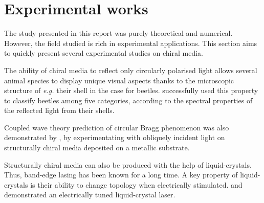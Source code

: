 \section{Experimental works}
\label{sec:experimental_work}

The study presented in this report was purely theoretical and numerical. However, the field studied is rich in experimental applications. This section aims to quickly present several experimental studies on chiral media.

The ability of chiral media to reflect only circularly polarised light allows several animal species to display unique visual aspects thanks to the microscopic structure of \textit{e.g.} their shell in the case for beetles. \Textcite{erten_experimental_2015} successfully used this property to classify beetles among five categories, according to the spectral properties of the reflected light from their shells.

Coupled wave theory prediction of circular Bragg phenomenon was also demonstrated by \textcite{carter_variation_2016}, by experimentating with obliquely incident light on structurally chiral media deposited on a metallic substrate.

Structurally chiral media can also be produced with the help of liquid-crystals. Thus, band-edge lasing has been known for a long time\cite{barna_band_2005}. A key property of liquid-crystals is their ability to change topology when electrically stimulated. \Textcite{maune_liquid-crystal_2004} and \textcite{xiang_electrically_2016} demonstrated an electrically tuned liquid-crystal laser.